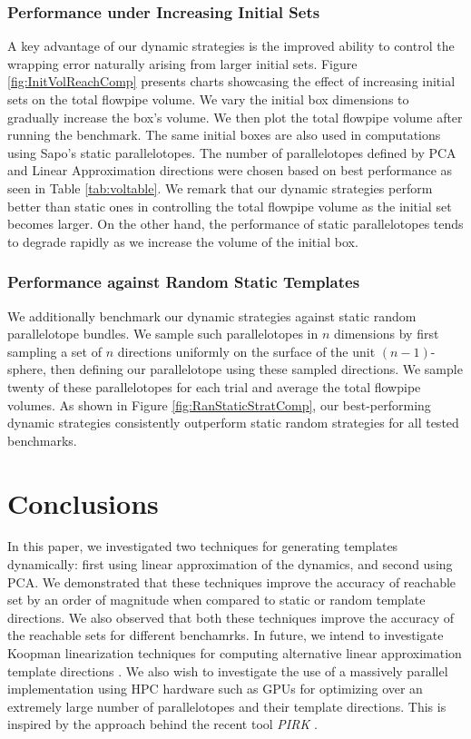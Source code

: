 \subsubsection{Performance under Increasing Initial Sets}
A key advantage of our dynamic strategies is the improved ability to control the wrapping error naturally arising from larger initial sets. Figure \ref{fig:InitVolReachComp} presents charts showcasing the effect of increasing initial sets on the total flowpipe volume. We vary the initial box dimensions to gradually increase the box's volume. We then plot the total flowpipe volume after running the benchmark. The same initial boxes are also used in computations using Sapo's static parallelotopes. The number of parallelotopes defined by PCA and Linear Approximation directions were chosen based on best performance as seen in Table \ref{tab:voltable}. We remark that our dynamic strategies perform better than static ones in controlling the total flowpipe volume as the initial set becomes larger. On the other hand, the performance of static parallelotopes tends to degrade rapidly as we increase the volume of the initial box.

\vspace{-1em}
\subsubsection{Performance against Random Static Templates}
We additionally benchmark our dynamic strategies against static random parallelotope bundles. We sample such parallelotopes in $n$ dimensions by first sampling a set of $n$ directions uniformly on the surface of the unit $(n-1)$-sphere, then defining our parallelotope using these sampled directions. We sample twenty of these parallelotopes for each trial and average the total flowpipe volumes. As shown in Figure \ref{fig:RanStaticStratComp}, our best-performing dynamic strategies consistently outperform static random strategies for all tested benchmarks.

\vspace{-0.8em}
\section{Conclusions}
In this paper, we investigated two techniques for generating templates dynamically: first using linear approximation of the dynamics, and second using PCA.
%
We demonstrated that these techniques improve the accuracy of reachable set by an order of magnitude when compared to static or random template directions.
%
We also observed that both these techniques improve the accuracy of the reachable sets for different benchamrks.
%
In future, we intend to investigate Koopman linearization techniques for computing alternative linear approximation template directions \cite{bak2021reachability}.
%
We also wish to investigate the use of a massively parallel implementation using HPC hardware such as GPUs for optimizing over an extremely large number of parallelotopes and their template directions. This is inspired by the approach behind the recent tool \emph{PIRK} \cite{devonport2020pirk}.


